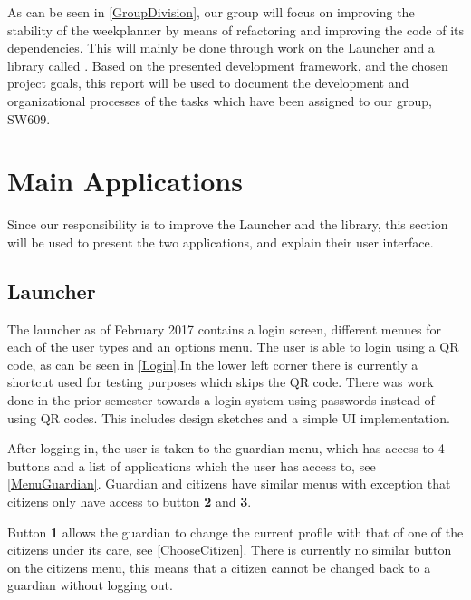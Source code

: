As can be seen in \autoref{GroupDivision}, our group will focus on improving the
stability of the weekplanner by means of refactoring and improving the code of
its dependencies. This will mainly be done through work on the Launcher and a
library called . Based on the presented development
framework, and the chosen project goals, this report will be used to document
the development and organizational processes of the tasks which have been
assigned to our group, SW609.

\section{Main Applications}
Since our responsibility is to improve the Launcher and the
 library, this section will be used to present the
two applications, and explain their user interface.

\subsection{Launcher}\label{LauncherReview}
The launcher as of February 2017 contains a login screen, different menues for
each of the user types and an options menu. The user is able to login using a
QR code, as can be seen in \autoref{Login}.In the lower left corner there is
currently a shortcut used for testing purposes which skips the QR code. There
was work done in the prior semester towards a login system using passwords
instead of using QR codes. This includes design sketches and a simple UI
implementation.


After logging in, the user is taken to the guardian menu, which has access to 4
buttons and a list of applications which the user has access to,
see \autoref{MenuGuardian}. Guardian and citizens have similar menus with
exception that citizens only have access to button \textbf{2} and \textbf{3}.


Button \textbf{1} allows the guardian to change the current profile with that of
one of the citizens under its care, see \autoref{ChooseCitizen}. There is currently no
similar button on the citizens menu, this means that a citizen cannot be changed
back to a guardian without logging out.

